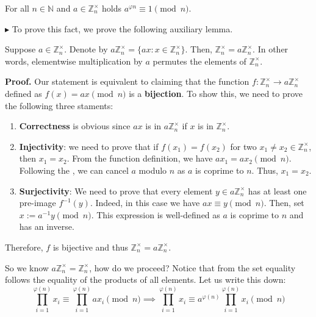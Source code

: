 \documentclass[../lecture-notes-148x210.tex]{subfiles}
\begin{document}
\begin{theorem} [Euler's]
    For all $n \in \mathbb{N}$ and $a \in \mathbb{Z}_n^{\times}$ 
    holds $a^{\varphi{n}} \equiv 1 \pmod{n}$.
\end{theorem}

$\blacktriangleright$ To prove this fact, we prove the following auxiliary lemma.

\begin{lemma}
    Suppose $a \in \mathbb{Z}_n^{\times}$. Denote by $a\mathbb{Z}_n^{\times} =
    \{ax: x \in \mathbb{Z}_n^{\times}\}$. Then, $\mathbb{Z}_n^{\times} =
    a\mathbb{Z}_n^{\times}$. In other words, elementwise multiplication by $a$
    permutes the elements of $\mathbb{Z}_n^{\times}$.
\end{lemma}

\textbf{Proof.} Our statement is equivalent to claiming that the 
function $f: \mathbb{Z}_n^{\times} \to a\mathbb{Z}_n^{\times}$ defined 
as $f(x) = ax \pmod{n}$ is a \textbf{bijection}. To show this, we need to prove the following 
three staments:
\begin{enumerate}
    \item \textbf{Correctness} is obvious since $ax$ is in $a\mathbb{Z}_n^{\times}$ if $x$ is in $\mathbb{Z}_n^{\times}$.
    \item \textbf{Injectivity}: we need to prove that if $f(x_1)=f(x_2)$ for two $x_1 \neq x_2 \in \mathbb{Z}_n^{\times}$, then 
    $x_1=x_2$. From the function definition, we have $ax_1=ax_2 \pmod{n}$. Following the , 
    we can cancel $a$ modulo $n$ as $a$ is coprime to $n$. Thus, $x_1=x_2$.
    \item \textbf{Surjectivity}: We need to prove that every element $y \in a\mathbb{Z}_n^{\times}$ has at least 
    one pre-image $f^{-1}(y)$. Indeed, in this case we have $ax \equiv y \pmod{n}$. Then, set $x := a^{-1}y \pmod {n}$. This 
    expression is well-defined as $a$ is coprime to $n$ and has an inverse.
\end{enumerate}

Therefore, $f$ is bijective and thus $\mathbb{Z}_n^{\times} = a\mathbb{Z}_n^{\times}$.

\vspace{10px}

So we know $a\mathbb{Z}_n^{\times} = \mathbb{Z}_n^{\times}$, how do we proceed? Notice that 
from the set equality follows the equality of the products of all elements. Let us write this down:
\begin{equation*}
    \prod_{i = 1}^{\varphi(n)} x_i \equiv \prod_{i = 1}^{\varphi(n)} a x_i \pmod{n} \implies \prod_{i = 1}^{\varphi(n)} x_i \equiv a^{\varphi(n)} \prod_{i = 1}^{\varphi(n)} x_i \pmod{n}
\end{equation*}    
    
\end{document}
